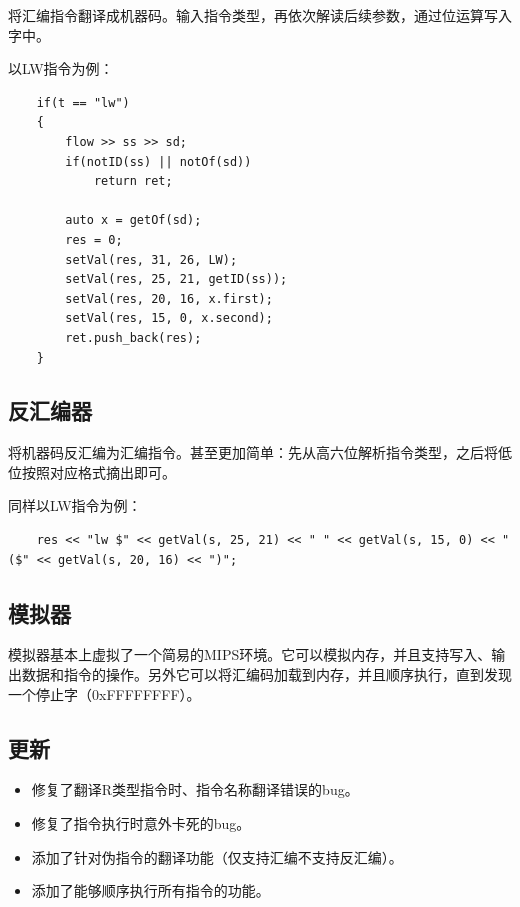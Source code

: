 \documentclass{ctexart}
\begin{document}
        \par 将汇编指令翻译成机器码。输入指令类型，再依次解读后续参数，通过位运算写入字中。
        \par 以LW指令为例：
        
\begin{lstlisting}
    if(t == "lw")
    {
        flow >> ss >> sd;
        if(notID(ss) || notOf(sd))
            return ret;

        auto x = getOf(sd);
        res = 0; 
        setVal(res, 31, 26, LW);
        setVal(res, 25, 21, getID(ss));
        setVal(res, 20, 16, x.first);
        setVal(res, 15, 0, x.second);
        ret.push_back(res);
    }
\end{lstlisting}

    \subsection {反汇编器}
    
        \par 将机器码反汇编为汇编指令。甚至更加简单：先从高六位解析指令类型，之后将低位按照对应格式摘出即可。
        \par 同样以LW指令为例：
        
\begin{lstlisting}
    res << "lw $" << getVal(s, 25, 21) << " " << getVal(s, 15, 0) << "($" << getVal(s, 20, 16) << ")";
\end{lstlisting}
        
    \subsection {模拟器}
        \par 模拟器基本上虚拟了一个简易的MIPS环境。它可以模拟内存，并且支持写入、输出数据和指令的操作。另外它可以将汇编码加载到内存，并且顺序执行，直到发现一个停止字（0xFFFFFFFF）。
        
    \subsection {更新}
    
        \begin{itemize}
            \item 修复了翻译R类型指令时、指令名称翻译错误的bug。
            \item 修复了指令执行时意外卡死的bug。
            \item 添加了针对伪指令的翻译功能（仅支持汇编不支持反汇编）。
            \item 添加了能够顺序执行所有指令的功能。
        \end{itemize}
\end{document}
